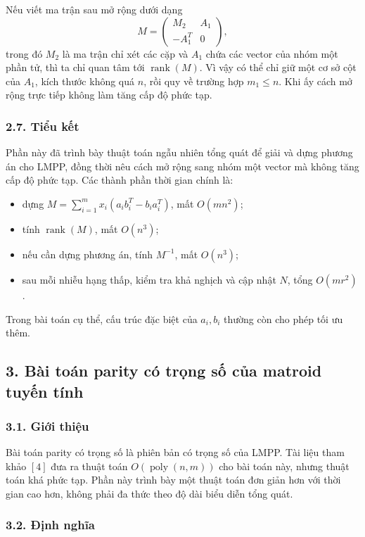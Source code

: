 \documentclass[11pt]{article}
\begin{document}
Nếu viết ma trận sau mở rộng dưới dạng
\[
  M=
  \begin{pmatrix}
    M_2&A_1\\
    -A_1^T&0
  \end{pmatrix},
\]
trong đó \(M_2\) là ma trận chỉ xét các cặp và \(A_1\) chứa các vector của nhóm
một phần tử, thì ta chỉ quan tâm tới \(\operatorname{rank}(M)\). Vì vậy có thể
chỉ giữ một cơ sở cột của \(A_1\), kích thước không quá \(n\), rồi quy về trường
hợp \(m_1\le n\). Khi ấy cách mở rộng trực tiếp không làm tăng cấp độ phức tạp.

\subsubsection*{2.7. Tiểu kết}

Phần này đã trình bày thuật toán ngẫu nhiên tổng quát để giải và dựng phương án
cho LMPP, đồng thời nêu cách mở rộng sang nhóm một vector mà không tăng cấp độ
phức tạp. Các thành phần thời gian chính là:
\begin{itemize}
  \item dựng
  \(M=\sum_{i=1}^{m}x_i(a_ib_i^T-b_ia_i^T)\), mất \(O(mn^2)\);
  \item tính \(\operatorname{rank}(M)\), mất \(O(n^3)\);
  \item nếu cần dựng phương án, tính \(M^{-1}\), mất \(O(n^3)\);
  \item sau mỗi nhiễu hạng thấp, kiểm tra khả nghịch và cập nhật \(N\), tổng
  \(O(mr^2)\).
\end{itemize}
Trong bài toán cụ thể, cấu trúc đặc biệt của \(a_i,b_i\) thường còn cho phép
tối ưu thêm.

\subsection*{3. Bài toán parity có trọng số của matroid tuyến tính}

\subsubsection*{3.1. Giới thiệu}

Bài toán parity có trọng số là phiên bản có trọng số của LMPP. Tài liệu tham
khảo \([4]\) đưa ra thuật toán \(O(\operatorname{poly}(n,m))\) cho bài toán này,
nhưng thuật toán khá phức tạp. Phần này trình bày một thuật toán đơn giản hơn
với thời gian cao hơn, không phải đa thức theo độ dài biểu diễn tổng quát.

\subsubsection*{3.2. Định nghĩa}
\end{document}
